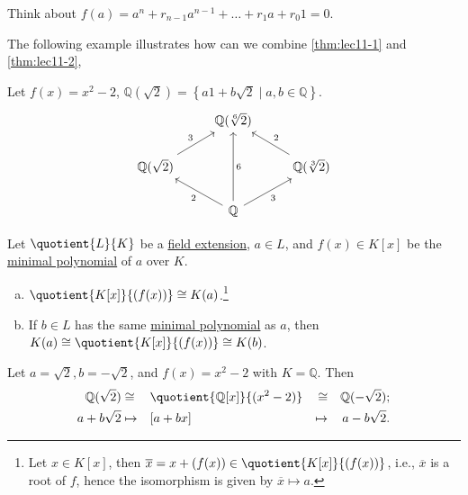 \begin{intuition}
	Think about \(f(a) = a^n + r_{n-1} a^{n-1} + \ldots + r_1 a + r_0 1 = 0\).
\end{intuition}

The following example illustrates how can we combine \autoref{thm:lec11-1} and \autoref{thm:lec11-2},

\begin{eg}
	Let \(f(x) = x^2 - 2\), \(\mathbb{Q} (\sqrt{2} ) = \left\{ a1+b\sqrt{2} \mid a, b\in \mathbb{Q} \right\} \).
	\[
		\begin{tikzcd}
			& {\mathbb{Q}(\sqrt[6]{2})} \\
			{\mathbb{Q}(\sqrt{2})} && {\mathbb{Q}(\sqrt[3]{2})} \\
			& {\mathbb{Q}}
			\arrow["3"', from=3-2, to=2-3]
			\arrow["2"', from=2-3, to=1-2]
			\arrow["6"', from=3-2, to=1-2]
			\arrow["2", from=3-2, to=2-1]
			\arrow["3", from=2-1, to=1-2]
		\end{tikzcd}
	\]
\end{eg}

\begin{theorem}
	Let \(\quotient{L}{K} \) be a \hyperref[def:field-extension]{field extension}, \(a\in L\), and \(f(x)\in K[x]\) be the \hyperref[def:minimal-polynomial]{minimal polynomial} of \(a\) over \(K\).
	\begin{enumerate}[(a)]
		\item \(\quotient{K[x]}{(f(x))} \cong K(a)\).\footnote{Let \(x\in K[x]\), then \(\overline{x} = x+(f(x))\in \quotient{K[x]}{(f(x))} \), i.e., \(\overline{x} \) is a root of \(f\), hence the isomorphism is given by \(\overline{x} \mapsto a\).}
		\item If \(b\in L\) has the same \hyperref[def:minimal-polynomial]{minimal polynomial} as \(a\), then \(K(a) \cong \quotient{K[x]}{(f(x))} \cong K(b)\).
	\end{enumerate}
\end{theorem}

\begin{eg}
	Let \(a=\sqrt{2}, b=-\sqrt{2} \), and \(f(x) = x^2 - 2\) with \(K=\mathbb{Q} \). Then
	\[
		\begin{aligned}
			\mathbb{Q} (\sqrt{2} ) & \cong   &  & \quotient{\mathbb{Q} [x]}{(x^2 - 2)} & \cong   &  & \mathbb{Q} (-\sqrt{2} ); \\
			a+b\sqrt{2}            & \mapsto &  & [a+bx]                               & \mapsto &  & a-b\sqrt{2}.
		\end{aligned}
	\]
\end{eg}


